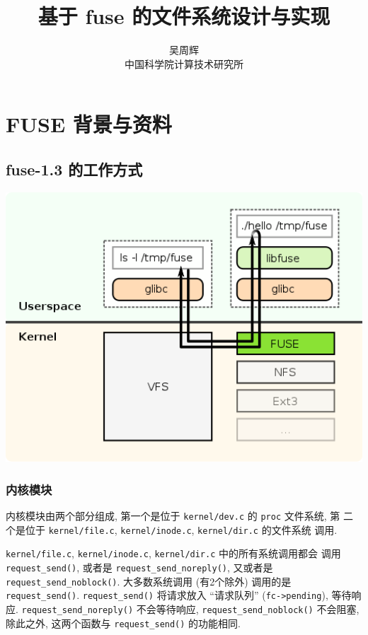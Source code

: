 \documentclass[nofonts, titlepage]{ctexart}
\title{基于 fuse 的文件系统设计与实现}
\author{吴周辉 \\ 中国科学院计算技术研究所}
\begin{document}
\maketitle
\tableofcontents

\section{FUSE 背景与资料}\label{fuse-ux80ccux666fux4e0eux8d44ux6599}

\subsection{fuse-1.3 的工作方式}

\begin{center}
\includegraphics[width=14cm]{./images/./FUSE_structure.svg.png}
\label{fig:fuse_structure}
\end{center}

\subsubsection{内核模块}\label{ux5185ux6838ux6a21ux5757}

内核模块由两个部分组成, 第一个是位于 \texttt{kernel/dev.c} 的
\texttt{proc} 文件系统, 第 二个是位于 \texttt{kernel/file.c},
\texttt{kernel/inode.c}, \texttt{kernel/dir.c} 的文件系统 调用.

\texttt{kernel/file.c}, \texttt{kernel/inode.c}, \texttt{kernel/dir.c}
中的所有系统调用都会 调用 \texttt{request\_send()}, 或者是
\texttt{request\_send\_noreply()}, 又或者是
\texttt{request\_send\_noblock()}. 大多数系统调用 (有2个除外) 调用的是
\texttt{request\_send()}. \texttt{request\_send()} 将请求放入
``请求队列'' (\texttt{fc-\textgreater{}pending}), 等待响应.
\texttt{request\_send\_noreply()} 不会等待响应,
\texttt{request\_send\_noblock()} 不会阻塞, 除此之外, 这两个函数与
\texttt{request\_send()} 的功能相同.
\end{document}

